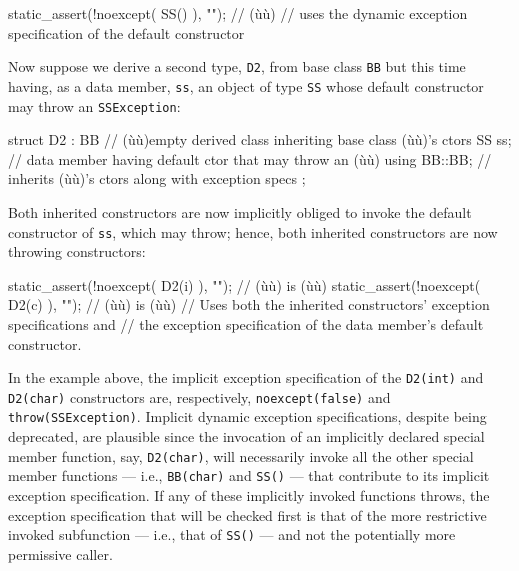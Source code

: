 \begin{emcppslisting}[emcppsbatch=e7]
static_assert(!noexcept( SS() ),  "");  // (ù{}ù)
    // uses the dynamic exception specification of the default constructor
\end{emcppslisting}
    

\noindent Now suppose we derive a second type, \lstinline!D2!, from base class
\lstinline!BB! but this time having, as a data member, \lstinline!ss!, an
object of type \lstinline!SS! whose default constructor may throw an
\lstinline!SSException!:

\begin{emcppslisting}[emcppsbatch=e7]
struct D2 : BB  // (ù{}ù)empty derived class inheriting base class (ù{}ù)'s ctors
{
    SS ss;         // data member having default ctor that may throw an (ù{}ù)
    using BB::BB;  // inherits (ù{}ù)'s ctors along with exception specs
};
\end{emcppslisting}
    

\noindent Both inherited constructors are now implicitly obliged to invoke the
default constructor of \lstinline!ss!, which may throw; hence, both
inherited constructors are now throwing constructors:

\begin{emcppslisting}[emcppsbatch=e7]
static_assert(!noexcept( D2(i) ), "");  // (ù{}ù) is (ù{}ù)
static_assert(!noexcept( D2(c) ), "");  // (ù{}ù) is (ù{}ù)
    // Uses both the inherited constructors' exception specifications and
    // the exception specification of the data member's default constructor.
\end{emcppslisting}
    

\noindent In the example above, the implicit exception specification of the
\lstinline!D2(int)! and \lstinline!D2(char)! constructors are, respectively,
\lstinline!noexcept(false)! and \lstinline!throw(SSException)!. Implicit
dynamic exception specifications, despite being deprecated, are
plausible since the invocation of an implicitly declared special member
function, say, \lstinline!D2(char)!, will necessarily invoke all the other
special member functions --- i.e., \lstinline!BB(char)! and \lstinline!SS()!
--- that contribute to its implicit exception specification. If any of
these implicitly invoked functions throws, the exception specification
that will be checked first is that of the more restrictive invoked
subfunction --- i.e., that of \lstinline!SS()! --- and not the potentially
more permissive caller.

